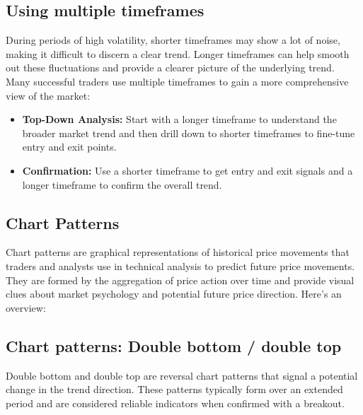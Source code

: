 \documentclass{report}
\begin{document}
     \bigbreak \noindent 
     \subsection{Using multiple timeframes}
     \bigbreak \noindent 
     During periods of high volatility, shorter timeframes may show a lot of noise, making it difficult to discern a clear trend. Longer timeframes can help smooth out these fluctuations and provide a clearer picture of the underlying trend.
     \bigbreak \noindent 
     Many successful traders use multiple timeframes to gain a more comprehensive view of the market:
     \begin{itemize}
         \item \textbf{Top-Down Analysis:} Start with a longer timeframe to understand the broader market trend and then drill down to shorter timeframes to fine-tune entry and exit points.
         \item \textbf{Confirmation:} Use a shorter timeframe to get entry and exit signals and a longer timeframe to confirm the overall trend.
     \end{itemize}

     \pagebreak 
     \subsection{Chart Patterns}
     \bigbreak \noindent 
     Chart patterns are graphical representations of historical price movements that traders and analysts use in technical analysis to predict future price movements. They are formed by the aggregation of price action over time and provide visual clues about market psychology and potential future price direction. Here’s an overview:

     \bigbreak \noindent 
     \subsection{Chart patterns: Double bottom / double top}
     \bigbreak \noindent 
     Double bottom and double top are reversal chart patterns that signal a potential change in the trend direction. These patterns typically form over an extended period and are considered reliable indicators when confirmed with a breakout.
     \bigbreak \noindent 
\end{document}
